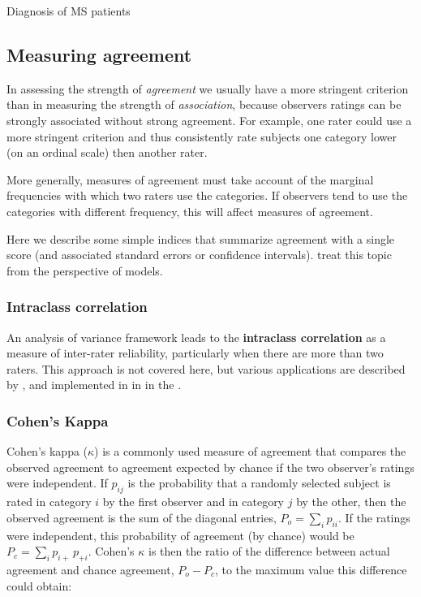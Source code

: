 \documentclass[11pt]{book}
\begin{document}
\begin{Example}[MS1]{Diagnosis of MS patients}
%
\end{Example}

\subsection{Measuring agreement}\label{sec:agreemeas}
In assessing the strength of \emph{agreement} we usually have a more
stringent criterion than in measuring the strength of \emph{association},
because observers ratings can be strongly associated without strong agreement.
For example, one rater could use a more stringent criterion and thus consistently rate subjects one category lower (on an ordinal scale) then another rater.

More generally, measures of agreement must take account of the
marginal frequencies with which two raters use the categories.
If observers tend to use the categories
with different frequency, this will affect measures of
agreement.

Here we describe some simple indices that summarize agreement with a
single score (and associated standard errors or confidence intervals).
\citet{vonEyeMun:2006} treat this topic from the perspective of
\loglin models.

\subsubsection{Intraclass correlation}
An analysis of variance framework leads to the {\bf intraclass correlation}
as a measure of inter-rater reliability, particularly when there are
more than two raters.
This approach is not covered here, but various applications are described
by \citet{ShroutFleiss:79}, and implemented in \R in 
in the .  

\subsubsection{Cohen's Kappa}

Cohen's kappa (\(\kappa\))
\citep{Cohen:60,Cohen:68} is a commonly used measure of agreement that
compares the observed agreement to agreement expected by chance if the two observer's
ratings were independent.
If $p_{ij}$ is the probability that a randomly selected subject is
rated in category $i$ by the first observer and in category $j$ by
the other, then the observed agreement is the sum of the diagonal
entries,  \(P_o  = \sum_i p_{ii}\).  If the ratings were independent,
this probability of agreement (by chance) would be \(P_c = \sum_i p_{i+} \,  p_{+i}\).
Cohen's $\kappa$ is then the ratio of the difference between actual
agreement and chance agreement, $P_o - P_c$, to the maximum value
this difference could obtain:
\end{document}
